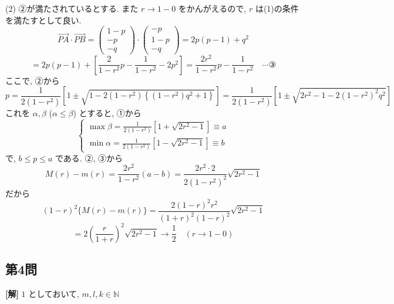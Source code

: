 \documentclass[../main.tex]{subfiles}
\begin{document}
\noindent
(2) ②が満たされているとする. また $r \to 1-0$ をかんがえるので, $r$ は(1)の条件を満たすとして良い.
\[
  \vec{PA} \cdot \vec{PB} =
  \begin{pmatrix} 1-p \\ -p \\ -q
  \end{pmatrix} \cdot
  \begin{pmatrix} -p \\ 1-p \\ -q
  \end{pmatrix} = 2p(p-1) + q^2
\]
\[
  = 2p(p-1) + \left[ \frac{2}{1-r^2}p - \frac{1}{1-r^2} - 2p^2 \right] = \frac{2r^2}{1-r^2}p - \frac{1}{1-r^2} \quad \cdots \text{③}
\]
ここで, ②から
\[
  p = \frac{1}{2(1-r^2)}\left[ 1 \pm \sqrt{1 - 2(1-r^2)\left\{(1-r^2)q^2+1\right\}} \right] = \frac{1}{2(1-r^2)}\left[ 1 \pm \sqrt{2r^2-1 - 2(1-r^2)^2 q^2} \right]
\]
これを $\alpha, \beta$ ($\alpha \le \beta$) とすると, ①から
\[
  \begin{cases}
    \max \beta = \frac{1}{2(1-r^2)} \left[ 1 + \sqrt{2r^2-1} \right] \equiv a \\
    \min \alpha = \frac{1}{2(1-r^2)} \left[ 1 - \sqrt{2r^2-1} \right] \equiv b
  \end{cases}
\]
で, $b \le p \le a$ である. ②, ③から
\[
  M(r) - m(r) = \frac{2r^2}{1-r^2}(a-b) = \frac{2r^2 \cdot 2}{2(1-r^2)^2} \sqrt{2r^2-1}
\]
だから
\[
  (1-r)^2 \{ M(r) - m(r) \} = \frac{2(1-r)^2 r^2}{(1+r)^2(1-r)^2} \sqrt{2r^2-1}
\]
\[
  = 2 \left(\frac{r}{1+r}\right)^2 \sqrt{2r^2-1} \longrightarrow \frac{1}{2} \quad (r \to 1-0)
\]

\newpage

\subsection*{第4問}

\noindent
\textbf{[解]} $1$ としておいて, $m, l, k \in \mathbb{N}$
\end{document}
